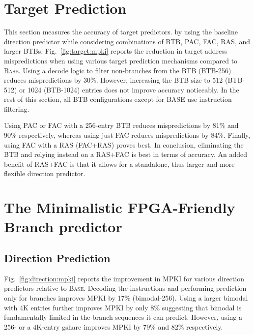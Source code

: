 \section{Target Prediction}
\label{sec:eval:target}

This section measures the accuracy of target predictors. by using the baseline direction predictor while considering combinations of BTB, PAC, FAC, RAS, and larger BTBs. Fig.~\ref{fig:target:mpki} reports the reduction in target address mispredictions when using various target prediction mechanisms compared to \textsc{Base}. Using a decode logic to filter non-branches from the BTB (BTB-256) reduces mispredictions by 30\%. However, increasing the BTB size to 512 (BTB-512) or 1024 (BTB-1024) entries does not improve accuracy noticeably. In the rest of this section, all BTB configurations except for BASE use instruction filtering.

Using PAC or FAC with a 256-entry BTB reduces mispredictions by 81\% and 90\% respectively, whereas using just FAC reduces mispredictions by 84\%. Finally, using FAC with a RAS (FAC+RAS) proves best. In conclusion, eliminating the BTB and relying instead on a RAS+FAC is best in terms of accuracy. An added benefit of RAS+FAC is that it allows for a standalone, thus larger and more flexible direction predictor. 


\section{The Minimalistic FPGA-Friendly Branch predictor}
\label{sec:eval:min}
\subsection{Direction Prediction}
\label{sec:eval:min:direction}
Fig.~\ref{fig:direction:mpki} reports the improvement in MPKI for various direction predictors relative to \textsc{Base}. Decoding the instructions and performing prediction only for branches improves MPKI by 17\% (bimodal-256). Using a larger bimodal with 4K entries further improves MPKI by only 8\% suggesting that bimodal is fundamentally limited in the branch sequences it can predict. However, using a 256- or a 4K-entry gshare improves MPKI by 79\% and 82\% respectively. 


